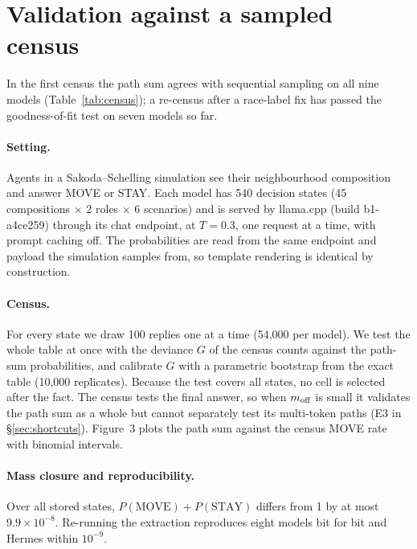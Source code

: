\section{Validation against a sampled census}
\label{sec:validation}

In the first census the path sum agrees with sequential sampling on all nine models (Table~\ref{tab:census}); a re-census after a race-label fix has passed the goodness-of-fit test on seven models so far.

\paragraph{Setting.}
Agents in a Sakoda--Schelling simulation see their neighbourhood composition and answer MOVE or STAY.
Each model has 540 decision states (45 compositions $\times$ 2 roles $\times$ 6 scenarios) and is served by llama.cpp (build b1-a4ce259) through its chat endpoint, at $T=0.3$, one request at a time, with prompt caching off.
The probabilities are read from the same endpoint and payload the simulation samples from, so template rendering is identical by construction.

\paragraph{Census.}
For every state we draw 100 replies one at a time (54,000 per model).
We test the whole table at once with the deviance $G$ of the census counts against the path-sum probabilities, and calibrate $G$ with a parametric bootstrap from the exact table (10,000 replicates).
Because the test covers all states, no cell is selected after the fact.
The census tests the final answer, so when $m_{\text{off}}$ is small it validates the path sum as a whole but cannot separately test its multi-token paths (E3 in \S\ref{sec:shortcuts}).
Figure~3 plots the path sum against the census MOVE rate with binomial intervals. 

\paragraph{Mass closure and reproducibility.}
Over all stored states, $P(\text{MOVE})+P(\text{STAY})$ differs from 1 by at most $9.9\times10^{-8}$.
Re-running the extraction reproduces eight models bit for bit and Hermes within $10^{-9}$.

